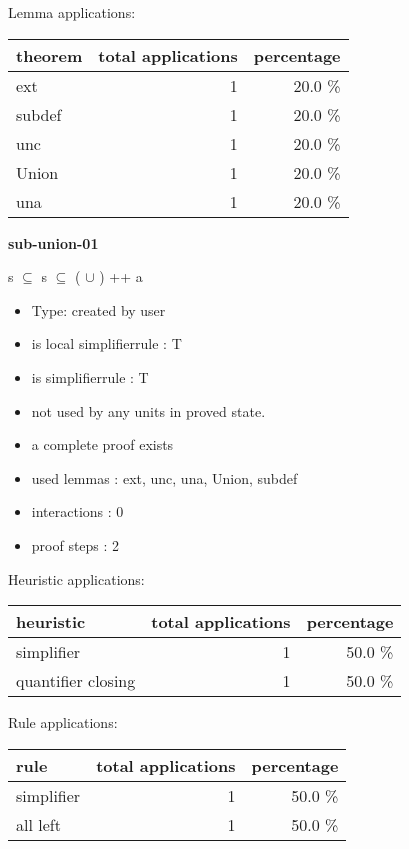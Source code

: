 \documentclass[a4paper]{article}
\begin{document}
Lemma applications:

\begin{supertabular}{l|r|r}
theorem	        & total applications & percentage \\ \hline
ext & 1 & 20.0 \% \\
subdef & 1 & 20.0 \% \\
unc & 1 & 20.0 \% \\
Union & 1 & 20.0 \% \\
una & 1 & 20.0 \% \\

\end{supertabular}
\pagebreak

{\LARGE\bf sub-union-01}\label{lemma-sub-union-01}

\medskip

 \Fol s $\subseteq$  \Imp s $\subseteq$ ( $\cup$ ) ++ a

\begin{itemize}

\item Type: created by user

\item is local simplifierrule : T
\item is simplifierrule : T
\item not used by any units in proved state.
\item       a complete proof exists
\item       used lemmas  : ext, unc, una, Union, subdef
\item       interactions : 0
\item       proof steps  : 2
\end{itemize}

\medskip


Heuristic applications:

\begin{supertabular}{l|r|r}
heuristic	& total applications & percentage \\ \hline
simplifier & 1 & 50.0 \% \\
quantifier closing & 1 & 50.0 \% \\

\end{supertabular}

Rule applications:

\begin{supertabular}{l|r|r}
rule	        & total applications & percentage \\ \hline
simplifier & 1 & 50.0 \% \\
all left & 1 & 50.0 \% \\

\end{supertabular}
\end{document}

